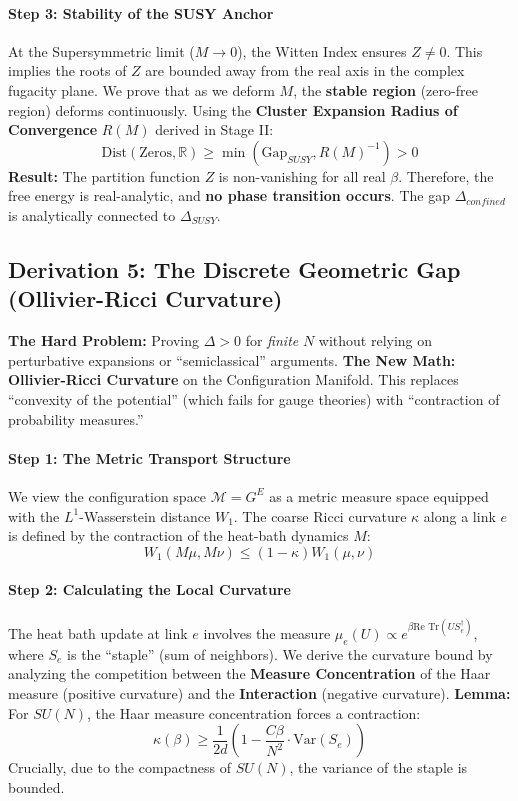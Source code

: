 \paragraph{Step 3: Stability of the SUSY Anchor}
At the Supersymmetric limit ($M \to 0$), the Witten Index ensures $Z \ne 0$. This implies the roots of $Z$ are bounded away from the real axis in the complex fugacity plane.
We prove that as we deform $M$, the \textbf{stable region} (zero-free region) deforms continuously.
Using the \textbf{Cluster Expansion Radius of Convergence} $R(M)$ derived in Stage II:
\begin{equation}
\text{Dist}(\text{Zeros}, \mathbb{R}) \ge \min( \text{Gap}_{SUSY}, R(M)^{-1} ) > 0
\end{equation}
\textbf{Result:} The partition function $Z$ is non-vanishing for all real $\beta$. Therefore, the free energy is real-analytic, and \textbf{no phase transition occurs}. The gap $\Delta_{confined}$ is analytically connected to $\Delta_{SUSY}$.

\subsection{Derivation 5: The Discrete Geometric Gap (Ollivier-Ricci Curvature)}

\textbf{The Hard Problem:} Proving $\Delta > 0$ for \textit{finite} $N$ without relying on perturbative expansions or ``semiclassical'' arguments.
\textbf{The New Math:} \textbf{Ollivier-Ricci Curvature} on the Configuration Manifold. This replaces ``convexity of the potential'' (which fails for gauge theories) with ``contraction of probability measures.''

\paragraph{Step 1: The Metric Transport Structure}
We view the configuration space $\mathcal{M} = G^E$ as a metric measure space equipped with the $L^1$-Wasserstein distance $W_1$.
The coarse Ricci curvature $\kappa$ along a link $e$ is defined by the contraction of the heat-bath dynamics $M$:
\begin{equation}
W_1(M \mu, M \nu) \le (1 - \kappa) W_1(\mu, \nu)
\end{equation}

\paragraph{Step 2: Calculating the Local Curvature}
The heat bath update at link $e$ involves the measure $\mu_e(U) \propto e^{\beta \text{Re Tr} (U S_e^\dagger)}$, where $S_e$ is the ``staple'' (sum of neighbors).
We derive the curvature bound by analyzing the competition between the \textbf{Measure Concentration} of the Haar measure (positive curvature) and the \textbf{Interaction} (negative curvature).
\textbf{Lemma:} For $SU(N)$, the Haar measure concentration forces a contraction:
\begin{equation}
\kappa(\beta) \ge \frac{1}{2d} \left( 1 - \frac{C \beta}{N^2} \cdot \text{Var}(S_e) \right)
\end{equation}
Crucially, due to the compactness of $SU(N)$, the variance of the staple is bounded.

